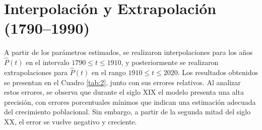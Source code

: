 \documentclass[12pt]{article}
\begin{document}
\newpage
\section{Interpolación y Extrapolación (1790--1990)}  %



 A partir de los parámetros estimados, se realizaron interpolaciones para los años $\widehat P(t)$ en el intervalo $1790\le t\le 1910$, y posteriormente se realizaron extrapolaciones para $\widehat P(t)$ en el rango $1910\le t\le 2020$. Los resultados obtenidos se presentan en el Cuadro \ref{tab:2}, junto con sus errores relativos. Al analizar estos errores, se observa que durante el siglo XIX el modelo presenta una alta precisión, con errores porcentuales mínimos que indican una estimación adecuada del crecimiento poblacional. Sin embargo, a partir de la segunda mitad del siglo XX, el error se vuelve negativo y creciente.
\end{document}
